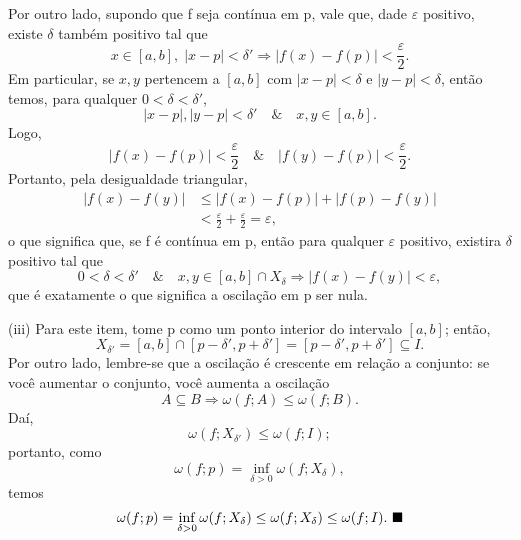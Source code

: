 \documentclass[../analysisII_notes.tex]{subfiles}
\begin{document}
\begin{proof*}
	Por outro lado, supondo que f seja contínua em p, vale que, dade \(\varepsilon \) positivo, existe \(\delta \) também positivo tal que
	\[
		x\in[a, b],\; |x-p|<\delta ' \Rightarrow |f(x)-f(p)|<\frac{\varepsilon }{2}.
	\]
	Em particular, se \(x, y\) pertencem a \([a, b]\) com \(|x-p|<\delta \) e \(|y-p|<\delta \), então temos, para qualquer \(0< \delta < \delta '\),
	\[
		|x-p|, |y-p|<\delta ' \quad\&\quad x, y\in [a, b].
	\]
	Logo,
	\[
		|f(x)-f(p)|<\frac{\varepsilon }{2}\quad\&\quad |f(y)-f(p)|<\frac{\varepsilon }{2}.
	\]
	Portanto, pela desigualdade triangular,
	\begin{align*}
		|f(x)-f(y)| & \leq |f(x)-f(p)|+|f(p)-f(y)|                                    \\
		            & <\frac{\varepsilon }{2} + \frac{\varepsilon }{2} = \varepsilon,
	\end{align*}
	o que significa que, se f é contínua em p, então para qualquer \(\varepsilon \) positivo, existira \(\delta \) positivo tal que
	\[
		0 < \delta <\delta ' \quad\&\quad x, y\in [a, b]\cap X_{\delta }\Rightarrow |f(x)-f(y)|<\varepsilon ,
	\]
	que é exatamente o que significa a oscilação em p ser nula.


	(iii) Para este item, tome p como um ponto interior do intervalo \([a, b]\); então,
	\[
		X_{\delta '} = [a, b]\cap [p-\delta ', p+\delta '] = [p-\delta ', p+\delta ']\subseteq I.
	\]
	Por outro lado, lembre-se que a oscilação é crescente em relação a conjunto: se você aumentar o conjunto, você aumenta a oscilação
	\[
		A\subseteq B \Rightarrow \omega (f; A)\leq \omega (f; B).
	\]
	Daí,
	\[
		\omega(f; X_{\delta '})\leq \omega (f; I);
	\]
	portanto, como
	\[
		\omega (f; p) = \inf_{\delta > 0}\omega (f; X_{\delta }),
	\]
	temos
	\[
		\omega (f; p) = \inf_{\delta > 0}\omega (f; X_{\delta }) \leq \omega (f; X_{\delta }) \leq \omega(f; I). \text{ $\blacksquare$}
	\]

\end{proof*}
\end{document}
